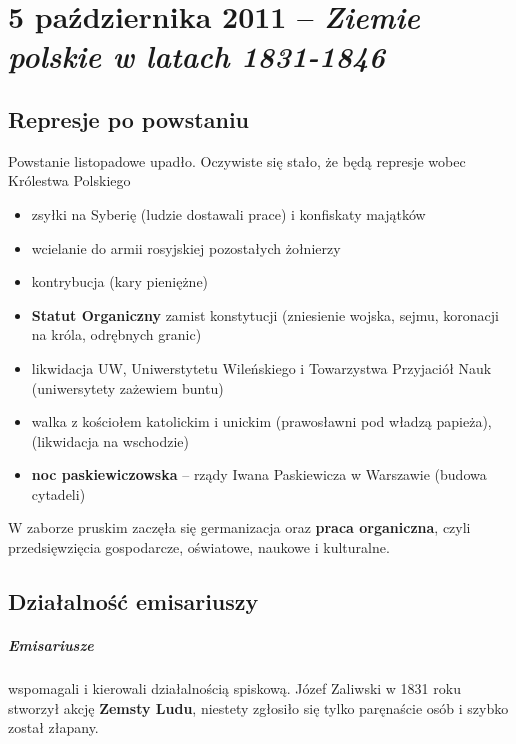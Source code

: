 \documentclass [a4paper, 11pt, oneside]{book}
\begin{document}

\chapter{5 października 2011 -- \textit{Ziemie polskie w latach 1831-1846}} %
\label{cha:5_pa_dziernika_2011_textit}
    \section{Represje po powstaniu} %
    \label{sec:represje_po_powstaniu}
        Powstanie listopadowe upadło. Oczywiste się stało, że będą represje wobec Królestwa Polskiego
        \begin{itemize}
            \item zsyłki na Syberię (ludzie dostawali prace) i konfiskaty majątków
            \item wcielanie do armii rosyjskiej pozostałych żołnierzy
            \item kontrybucja (kary pieniężne)
            \item \textbf{Statut Organiczny} zamist konstytucji (zniesienie wojska, sejmu, koronacji na króla, odrębnych granic)
            \item likwidacja UW, Uniwerstytetu Wileńskiego i Towarzystwa Przyjaciół Nauk (uniwersytety zażewiem buntu)
            \item walka z kościołem katolickim i unickim (prawosławni pod władzą papieża), (likwidacja na wschodzie)
            \item \textbf{noc paskiewiczowska} -- rządy Iwana Paskiewicza w Warszawie (budowa cytadeli)
        \end{itemize}
        W zaborze pruskim zaczęła się germanizacja oraz \textbf{praca organiczna}, czyli przedsięwzięcia gospodarcze, oświatowe, naukowe i kulturalne.
    \section{Działalność emisariuszy} %
    \label{sec:dzia_alno_emisariuszy}
        \paragraph{Emisariusze} wspomagali i kierowali działalnością spiskową. Józef Zaliwski w 1831 roku stworzył akcję \textbf{Zemsty Ludu}, niestety zgłosiło się tylko paręnaście osób i szybko został złapany.
\end{document}
